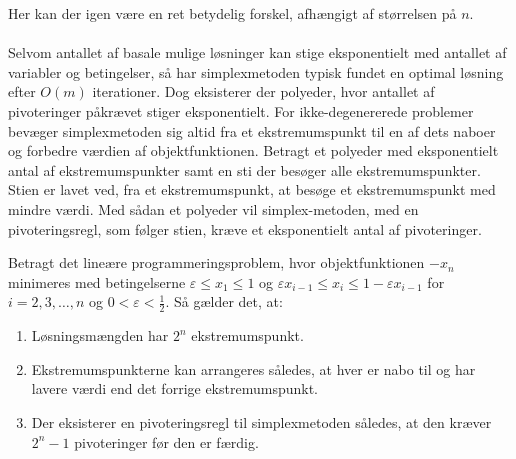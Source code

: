 Her kan der igen være en ret betydelig forskel, afhængigt af størrelsen på $n$.\\\\
%
Selvom antallet af basale mulige løsninger kan stige eksponentielt med antallet af variabler og betingelser, så har simplexmetoden typisk fundet en optimal løsning efter $O(m)$ iterationer.
Dog eksisterer der polyeder, hvor antallet af pivoteringer påkrævet stiger eksponentielt.
For ikke-degenererede problemer bevæger simplexmetoden sig altid fra et ekstremumspunkt til en af dets naboer og forbedre værdien af objektfunktionen.
Betragt et polyeder med eksponentielt antal af ekstremumspunkter samt en sti der besøger alle ekstremumspunkter.
Stien er lavet ved, fra et ekstremumspunkt, at besøge et ekstremumspunkt med mindre værdi.
Med sådan et polyeder vil simplex-metoden, med en pivoteringsregl, som følger stien, kræve et eksponentielt antal af pivoteringer.
\begin{thm}{}{}
Betragt det lineære programmeringsproblem, hvor objektfunktionen $-x_n$ minimeres med betingelserne $\varepsilon \leq x_1 \leq 1$ og $\varepsilon x_{i-1} \leq x_i \leq 1 - \varepsilon x_{i-1}$ for $i = 2, 3, \ldots, n$ og $0 < \varepsilon < \frac{1}{2}$.
Så gælder det, at:
%
\begin{enumerate}[label=(\alph*)]
\item Løsningsmængden har $2^n$ ekstremumspunkt.
\item Ekstremumspunkterne kan arrangeres således, at hver er nabo til og har lavere værdi end det forrige ekstremumspunkt.
\item Der eksisterer en pivoteringsregl til simplexmetoden således, at den kræver $2^n-1$ pivoteringer før den er færdig.
\end{enumerate}
%
\end{thm}
%
